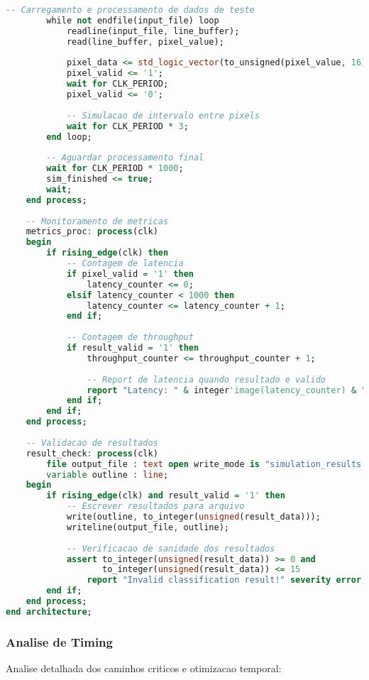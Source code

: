 \begin{lstlisting}[language=VHDL]
        -- Carregamento e processamento de dados de teste
        while not endfile(input_file) loop
            readline(input_file, line_buffer);
            read(line_buffer, pixel_value);
            
            pixel_data <= std_logic_vector(to_unsigned(pixel_value, 16));
            pixel_valid <= '1';
            wait for CLK_PERIOD;
            pixel_valid <= '0';
            
            -- Simulacao de intervalo entre pixels
            wait for CLK_PERIOD * 3;
        end loop;
        
        -- Aguardar processamento final
        wait for CLK_PERIOD * 1000;
        sim_finished <= true;
        wait;
    end process;
    
    -- Monitoramento de metricas
    metrics_proc: process(clk)
    begin
        if rising_edge(clk) then
            -- Contagem de latencia
            if pixel_valid = '1' then
                latency_counter <= 0;
            elsif latency_counter < 1000 then
                latency_counter <= latency_counter + 1;
            end if;
            
            -- Contagem de throughput
            if result_valid = '1' then
                throughput_counter <= throughput_counter + 1;
                
                -- Report de latencia quando resultado e valido
                report "Latency: " & integer'image(latency_counter) & " cycles";
            end if;
        end if;
    end process;
    
    -- Validacao de resultados
    result_check: process(clk)
        file output_file : text open write_mode is "simulation_results.txt";
        variable outline : line;
    begin
        if rising_edge(clk) and result_valid = '1' then
            -- Escrever resultados para arquivo
            write(outline, to_integer(unsigned(result_data)));
            writeline(output_file, outline);
            
            -- Verificacao de sanidade dos resultados
            assert to_integer(unsigned(result_data)) >= 0 and 
                   to_integer(unsigned(result_data)) <= 15
                report "Invalid classification result!" severity error;
        end if;
    end process;
end architecture;
\end{lstlisting}

\subsubsection{Analise de Timing}
Analise detalhada dos caminhos criticos e otimizacao temporal:


